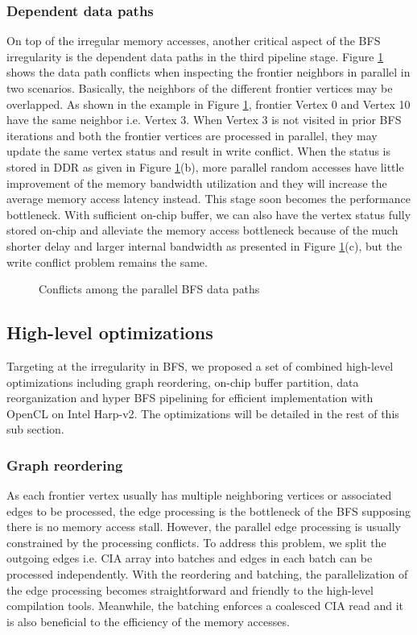 \subsubsection{Dependent data paths}
On top of the irregular memory accesses, another critical aspect of the BFS irregularity 
is the dependent data paths in the third pipeline stage. Figure \ref{fig:write-conflict} shows
the data path conflicts when inspecting the frontier neighbors in parallel in two scenarios. 
Basically, the neighbors of the different frontier vertices may be overlapped. 
As shown in the example in Figure \ref{fig:write-conflict},  frontier Vertex 0 and Vertex 10 
have the same neighbor i.e. Vertex 3. When Vertex 3 is not visited in prior BFS iterations 
and both the frontier vertices are processed in parallel, they may update the same vertex 
status and result in write conflict. When the status is stored in DDR as given 
in Figure \ref{fig:write-conflict}(b), more parallel 
random accesses have little improvement of the memory bandwidth utilization and they will
increase the average memory access latency instead. This stage soon becomes the performance 
bottleneck. With sufficient on-chip buffer, we can also have the vertex status fully stored 
on-chip and alleviate the memory access bottleneck because of the much shorter delay 
and larger internal bandwidth as presented in Figure \ref{fig:write-conflict}(c), 
but the write conflict problem remains the same. 
\begin{figure}
    \caption{Conflicts among the parallel BFS data paths}
\label{fig:write-conflict}
\vspace{-1em}
\end{figure}


\subsection{High-level optimizations}
Targeting at the irregularity in BFS, we proposed a set of 
combined high-level optimizations including graph reordering, on-chip buffer partition, 
data reorganization and hyper BFS pipelining for efficient implementation 
with OpenCL on Intel Harp-v2. The optimizations will be detailed in the rest of 
this sub section. 

\subsubsection{Graph reordering}
As each frontier vertex usually has multiple neighboring 
vertices or associated edges to be processed, the edge processing 
is the bottleneck of the BFS supposing there is no memory access stall.
However, the parallel edge processing is usually constrained by the 
processing conflicts. To address this problem, we split the outgoing edges i.e. CIA array 
into batches and edges in each batch can be processed independently.
With the reordering and batching, the parallelization of the edge processing 
becomes straightforward and friendly to the high-level compilation tools.
Meanwhile, the batching enforces a coalesced CIA read and it is also beneficial to 
the efficiency of the memory accesses. 

